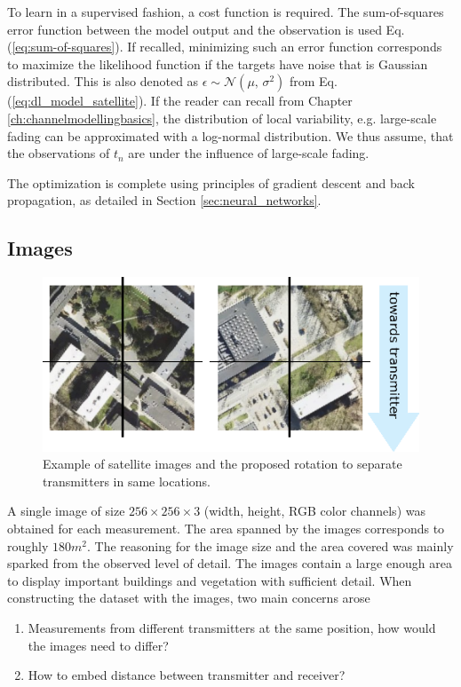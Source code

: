 To learn in a supervised fashion, a cost function is required. The sum-of-squares error function between the model output and the observation is used Eq. (\ref{eq:sum-of-squares}). If recalled, minimizing such an error function corresponds to maximize the likelihood function if the targets have noise that is Gaussian distributed. This is also denoted as $\epsilon \sim \mathcal{N}(\mu,\,\sigma^{2})$ from Eq. (\ref{eq:dl_model_satellite}). If the reader can recall from Chapter \ref{ch:channelmodellingbasics}, the distribution of local variability, e.g. large-scale fading can be approximated with a log-normal distribution. We thus assume, that the observations of $t_n$ are under the influence of large-scale fading.

The optimization is complete using principles of gradient descent and back propagation, as detailed in Section \ref{sec:neural_networks}.



\subsection{Images}


\begin{figure}[h]
    \centering
    \includegraphics{chapters/part_pathloss/figures/satellite_example.eps}
    \caption{Example of satellite images and the proposed rotation to separate transmitters in same locations.}
    \label{fig:satellite_example}
\end{figure}
A single image of size $256 \times 256 \times 3$ (width, height, RGB color channels) was obtained for each measurement. The area spanned by the images corresponds to roughly $180 m^2$. The reasoning for the image size and the area covered was mainly sparked from the observed level of detail. The images contain a large enough area to display important buildings and vegetation with sufficient detail. When constructing the dataset with the images, two main concerns arose
\begin{enumerate}

    \item Measurements from different transmitters at the same position, how would the images need to differ?
    \item How to embed distance between transmitter and receiver?
\end{enumerate}

